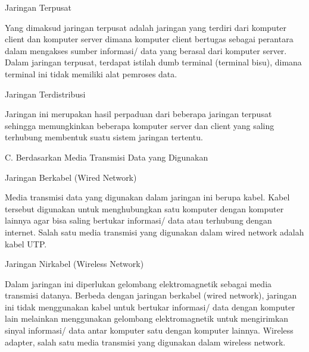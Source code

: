 \documentclass{wileySix}
\begin{document}
\vspace{12pt}
\noindent 
\begin{myEnumerate}
	\item Jaringan Terpusat \par
	Yang dimaksud jaringan terpusat adalah jaringan yang terdiri dari komputer client dan komputer server dimana komputer client bertugas sebagai perantara dalam mengakses sumber informasi/ data yang berasal dari komputer server. Dalam jaringan terpusat, terdapat istilah dumb terminal (terminal bisu), dimana terminal ini tidak memiliki alat pemroses data. \par
	\vspace{12pt}
	\noindent 
	\item Jaringan Terdistribusi\end{myEnumerate}
\par
Jaringan ini merupakan hasil perpaduan dari beberapa jaringan terpusat sehingga memungkinkan beberapa komputer server dan client yang saling terhubung membentuk suatu sistem jaringan tertentu. \par
\vspace{12pt}
\vspace{12pt}
\vspace{12pt}
\vspace{12pt}
\noindent 
C. Berdasarkan Media Transmisi Data yang Digunakan \par
\noindent 
\begin{myEnumerate}
	\item Jaringan Berkabel (Wired Network) \par
	Media transmisi data yang digunakan dalam jaringan ini berupa kabel. Kabel tersebut digunakan untuk menghubungkan satu komputer dengan komputer lainnya agar bisa saling bertukar informasi/ data atau terhubung dengan internet. Salah satu media transmisi yang digunakan dalam wired network adalah kabel UTP. \par
	\vspace{12pt}
	\noindent 
	\item Jaringan Nirkabel (Wireless Network)\end{myEnumerate}
\par
Dalam jaringan ini diperlukan gelombang elektromagnetik sebagai media transmisi datanya. Berbeda dengan jaringan berkabel (wired network), jaringan ini tidak menggunakan kabel untuk bertukar informasi/ data dengan komputer lain melainkan menggunakan gelombang elektromagnetik untuk mengirimkan sinyal informasi/ data antar komputer satu dengan komputer lainnya. Wireless adapter, salah satu media transmisi yang digunakan dalam wireless network. \par
\end{document}
